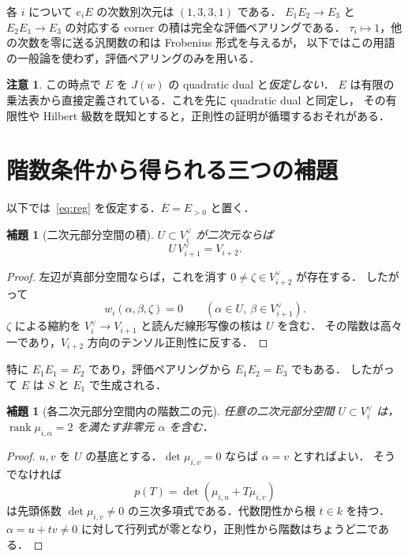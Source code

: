 \documentclass[a4paper,11pt]{ltjsarticle}
\newtheorem{lemma}[theorem]{補題}
\theoremstyle{definition}
\newtheorem{remark}[theorem]{注意}
\DeclareMathOperator{\rank}{rank}
\newcommand{\dual}{^{\vee}}
\newcommand{\barE}{\overline E}
\begin{document}
各 $i$ について $e_iE$ の次数別次元は $(1,3,3,1)$ である．
$E_1E_2\to E_3$ と $E_2E_1\to E_3$ の対応する corner の積は完全な評価ペアリングである．
$\tau_i\mapsto1$，他の次数を零に送る汎関数の和は Frobenius 形式を与えるが，
以下ではこの用語の一般論を使わず，評価ペアリングのみを用いる．

\begin{remark}
この時点で $E$ を $J(w)$ の quadratic dual と\emph{仮定しない}．
$E$ は有限の乗法表から直接定義されている．これを先に quadratic dual と同定し，
その有限性や Hilbert 級数を既知とすると，正則性の証明が循環するおそれがある．
\end{remark}

\section{階数条件から得られる三つの補題}
以下では~\eqref{eq:reg} を仮定する．$\barE=E_{>0}$ と置く．

\begin{lemma}[二次元部分空間の積]\label{lem:plane}
$U\subset V_i\dual$ が二次元ならば
\begin{equation}\label{eq:planeproduct}
 U\,V_{i+1}\dual=V_{i+2}.
\end{equation}
\end{lemma}
\begin{proof}
左辺が真部分空間ならば，これを消す $0\ne\zeta\in V_{i+2}\dual$ が存在する．
したがって
\[
 w_i(\alpha,\beta,\zeta)=0\qquad(\alpha\in U,\ \beta\in V_{i+1}\dual).
\]
$\zeta$ による縮約を $V_i\dual\to V_{i+1}$ と読んだ線形写像の核は $U$ を含む．
その階数は高々一であり，$V_{i+2}$ 方向のテンソル正則性に反する．
\end{proof}

特に $E_1E_1=E_2$ であり，評価ペアリングから $E_1E_2=E_3$ でもある．
したがって $E$ は $S$ と $E_1$ で生成される．

\begin{lemma}[各二次元部分空間内の階数二の元]\label{lem:root}
任意の二次元部分空間 $U\subset V_i\dual$ は，
$\rank\mu_{i,\alpha}=2$ を満たす非零元 $\alpha$ を含む．
\end{lemma}
\begin{proof}
$u,v$ を $U$ の基底とする．$\det\mu_{i,v}=0$ ならば $\alpha=v$ とすればよい．
そうでなければ
\[
 p(T)=\det(\mu_{i,u}+T\mu_{i,v})
\]
は先頭係数 $\det\mu_{i,v}\ne0$ の三次多項式である．代数閉性から根 $t\in k$ を持つ．
$\alpha=u+tv\ne0$ に対して行列式が零となり，正則性から階数はちょうど二である．
\end{proof}
\end{document}
